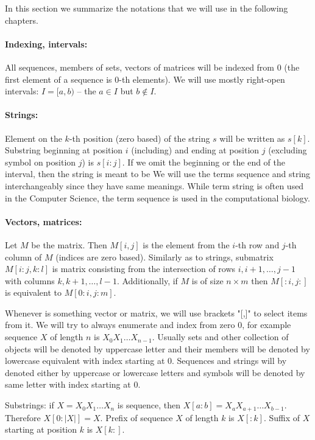In this section we summarize the notations that we will use in the following
chapters.

\paragraph{Indexing, intervals:} All sequences, members of sets, vectors of
matrices will be indexed from $0$ (the first element of a sequence is $0$-th
elements). We will use mostly right-open intervals: $I=[a,b)$ -- the $a\in I$
but $b\notin I$. 

\paragraph{Strings:} Element on the $k$-th position (zero based) of the string $s$
will be written as $s[k]$. Substring beginning at position $i$ (including) and
ending at position $j$ (excluding symbol on position $j$) is $s[i:j]$.
If we omit the beginning or the end of the interval, then the string is meant to
be 
We will use the terms sequence and string interchangeably since they have
same meanings. While term string is often used in the Computer Science, the term
sequence is used in the computational biology.

\paragraph{Vectors, matrices:}
Let $M$ be the matrix. Then $M[i,j]$ is the element from the $i$-th row and
$j$-th column of $M$ (indices are zero based). Similarly as to strings,
submatrix $M[i:j,k:l]$ is matrix consisting from the intersection of rows
$i,i+1,\dots, j-1$ with columns $k,k+1,\dots,l-1$. Additionally, if 
$M$ is of size $n\times m$ then $M[:i,j:]$ is equivalent to $M[0:i,j:m]$.

Whenever is something vector or matrix, we will use brackets "[,]" to select
items from it. We will try to always enumerate and index from zero 0, for
example sequence $X$ of length $n$ is $X_0X_1\dots X_{n-1}$. Usually sets and
other collection of objects will be denoted by uppercase letter and their
members will be denoted by lowercase equivalent  with index starting at 0.
Sequences and strings will by denoted either by uppercase or lowercase letters
and symbols will be denoted by same letter with index starting at 0.

Substrings: if $X=X_0X_1\dots X_n$ is sequence, then
$X\left[a:b\right]=X_aX_{a+1}\dots X_{b-1}$. Therefore $X[0:|X|]=X$. Prefix of
sequence $X$ of length $k$ is $X[:k]$. Suffix of $X$ starting at position $k$ is
$X[k:]$.

